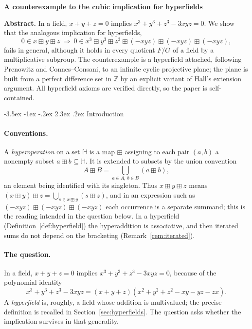 \documentclass[12pt]{article}
\makeatletter
\renewcommand\section{\@startsection{section}{1}{\z@}%
  {-3.5ex \@plus -1ex \@minus -.2ex}%
  {2.3ex \@plus.2ex}%
  {\normalfont\bfseries}}
\theoremstyle{plain}
\theoremstyle{definition}
\newcommand{\Z}{\mathbb{Z}}
\newcommand{\Hh}{\mathbb{H}}
\newcommand{\bp}{\boxplus}
\makeatother
\begin{document}
\begin{center}
{\textbf{A counterexample to the cubic implication for hyperfields}}
\end{center}

\medskip
\noindent\textbf{Abstract.}
In a field, $x+y+z=0$ implies $x^3+y^3+z^3-3xyz=0$.  We show that the
analogous implication for hyperfields,
\[
 0\in x\bp y\bp z
 \ \Longrightarrow\
 0\in x^3\bp y^3\bp z^3\bp(-xyz)\bp(-xyz)\bp(-xyz),
\]
fails in general, although it holds in every quotient $F/G$ of a field
by a multiplicative subgroup.  The counterexample is a hyperfield
attached, following Prenowitz and Connes--Consani, to an infinite
cyclic projective plane; the plane is built from a perfect difference
set in $\Z$ by an explicit variant of Hall's extension argument.  All
hyperfield axioms are verified directly, so the paper is
self-contained.

\section{Introduction}\label{sec:intro}

\paragraph{Conventions.}
A \emph{hyperoperation} on a set $\Hh$ is a map $\bp$ assigning to each
pair $(a,b)$ a nonempty subset $a\bp b\subseteq\Hh$.  It is extended to
subsets by the union convention
\begin{equation}\label{eq:union}
 A\bp B=\bigcup_{a\in A,\ b\in B}(a\bp b),
\end{equation}
an element being identified with its singleton.  Thus
$x\bp y\bp z$ means $(x\bp y)\bp z=\bigcup_{s\in x\bp y}(s\bp z)$, and
in an expression such as $(-xyz)\bp(-xyz)\bp(-xyz)$ each occurrence is a
separate summand; this is the reading intended in the question below.
In a hyperfield (Definition~\ref{def:hyperfield}) the hyperaddition is
associative, and then iterated sums do not depend on the bracketing
(Remark~\ref{rem:iterated}).

\paragraph{The question.}
In a field, $x+y+z=0$ implies $x^3+y^3+z^3-3xyz=0$, because of the
polynomial identity
\begin{equation}\label{eq:cubic}
 x^3+y^3+z^3-3xyz=(x+y+z)(x^2+y^2+z^2-xy-yz-zx).
\end{equation}
A \emph{hyperfield} is, roughly, a field whose addition is multivalued;
the precise definition is recalled in Section~\ref{sec:hyperfields}.
The question asks whether the implication survives in that generality.
\end{document}
